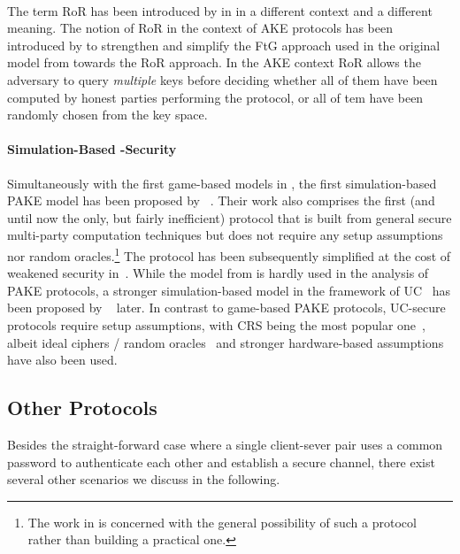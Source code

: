 \paragraph{}
The term \acl{RoR} has been introduced by \citeauthor{Bellare97} in \cite{Bellare97} in a different context and a different meaning.
The notion of \ac{RoR} in the context of \acl{AKE} protocols has been introduced by \citeauthor{Abdalla2005} to strengthen and simplify the \ac{FtG} approach used in the original model from \cite{Bellare2000} towards the \ac{RoR} approach.
In the \ac{AKE} context \ac{RoR} allows the adversary to query \emph{multiple} keys before deciding whether all of them have been computed by honest parties performing the protocol, or all of tem  have been randomly chosen from the key space.


\paragraph{Simulation-Based -Security}
Simultaneously with the first game-based models in \cite{Bellare2000,Boyko2000}, the first simulation-based \ac{PAKE} model has been proposed by \citeauthor{Goldreich01}~\cite{Goldreich01}.
Their work also comprises the first (and until now the only, but fairly inefficient) protocol that is built from general secure multi-party computation techniques but does not require any setup assumptions nor random oracles.\footnote{The work in \cite{Goldreich01} is concerned with the general possibility of such a protocol rather than building a practical one.}
The protocol has been subsequently simplified at the cost of weakened security in~\cite{NguyenV04}.
While the model from \cite{Goldreich01} is hardly used in the analysis of \ac{PAKE} protocols, a stronger simulation-based model in the framework of \acl{UC}~\cite{Canetti2001a} has been proposed by \citeauthor{Canetti2005}~\cite{Canetti2005} later.
In contrast to game-based \ac{PAKE} protocols, \ac{UC}-secure protocols require setup assumptions, with CRS being the most popular one~\cite{Katz2011}, albeit ideal ciphers / random oracles~\cite{Abdalla2008} and stronger hardware-based assumptions~\cite{cryptoeprint:2012:537} have also been used.


\subsection{Other  Protocols}
Besides the straight-forward case where a single client-sever pair uses a common password to authenticate each other and establish a secure channel, there exist several other scenarios we discuss in the following.

